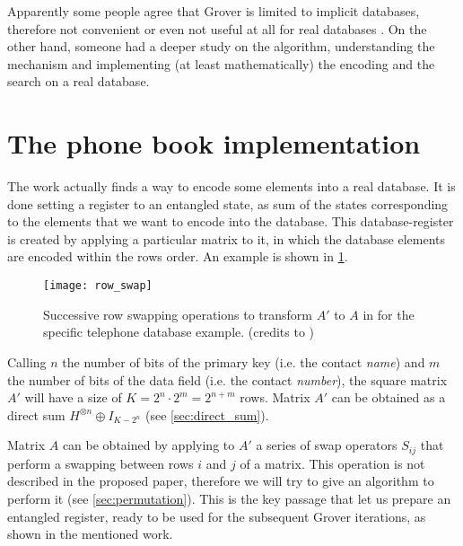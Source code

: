 \bigskip

Apparently some people agree that Grover is limited to implicit databases, therefore not convenient or even not useful at all for real databases \cite{1425397, Zalka2000, stackexchange1, stackexchange2, stackexchange3}. On the other hand, someone had a deeper study on the algorithm, understanding the mechanism and implementing (at least mathematically) the encoding and the search on a real database. \cite{alsing2011grover}

%


\section{The phone book implementation}

The work \cite{alsing2011grover} actually finds a way to encode some elements into a real database. It is done setting a register to an entangled state, as sum of the states corresponding to the elements that we want to encode into the database. This database-register is created by applying a particular matrix to it, in which the database elements are encoded within the rows order. An example is shown in \cref{fig:row_swap}.

\begin{figure}
	\centering
	\texttt{[image: row\_swap]}
	\caption{Successive row swapping operations to transform $A'$ to $A$ in for the specific telephone database example. (credits to \cite{alsing2011grover})}
	\label{fig:row_swap}
\end{figure}

Calling $n$ the number of bits of the primary key (i.e. the contact \textit{name}) and $m$ the number of bits of the data field (i.e. the contact \textit{number}), the square matrix $A'$ will have a size of $K = 2^n \cdot 2^m = 2^{n+m}$ rows. Matrix $A'$ can be obtained as a direct sum $H^{\otimes n} \oplus I_{K-2^n}$ (see \cref{sec:direct_sum}).

Matrix $A$ can be obtained by applying to $A'$ a series of swap operators $S_{ij}$ that perform a swapping between rows $i$ and $j$ of a matrix. This operation is not described in the proposed paper, therefore we will try to give an algorithm to perform it (see \cref{sec:permutation}). This is the key passage that let us prepare an entangled register, ready to be used for the subsequent Grover iterations, as shown in the mentioned work.

